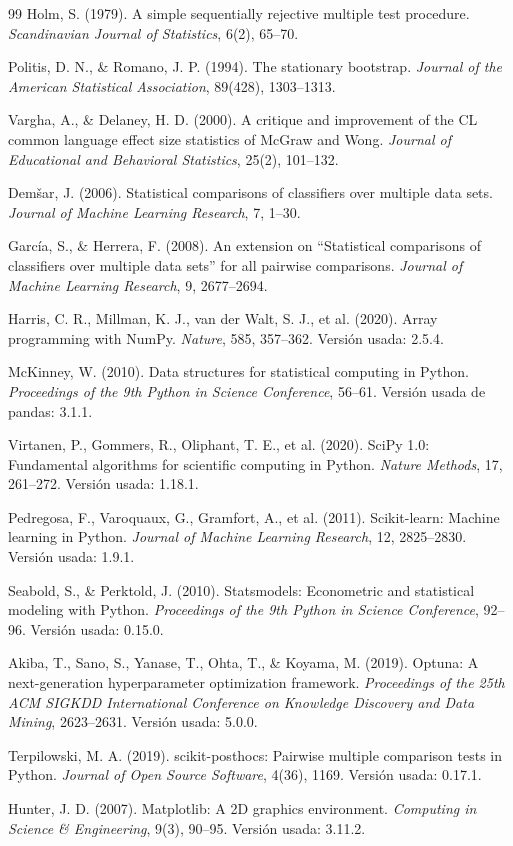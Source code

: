 \documentclass[11pt]{article}
\begin{document}
\begin{thebibliography}{99}
 Holm, S. (1979). A simple sequentially rejective multiple test procedure. \textit{Scandinavian Journal of Statistics}, 6(2), 65--70.

 Politis, D. N., \& Romano, J. P. (1994). The stationary bootstrap. \textit{Journal of the American Statistical Association}, 89(428), 1303--1313.

 Vargha, A., \& Delaney, H. D. (2000). A critique and improvement of the CL common language effect size statistics of McGraw and Wong. \textit{Journal of Educational and Behavioral Statistics}, 25(2), 101--132.

 Dem\v{s}ar, J. (2006). Statistical comparisons of classifiers over multiple data sets. \textit{Journal of Machine Learning Research}, 7, 1--30.

 García, S., \& Herrera, F. (2008). An extension on ``Statistical comparisons of classifiers over multiple data sets'' for all pairwise comparisons. \textit{Journal of Machine Learning Research}, 9, 2677--2694.

 Harris, C. R., Millman, K. J., van der Walt, S. J., et al. (2020). Array programming with NumPy. \textit{Nature}, 585, 357--362. Versión usada: 2.5.4.

 McKinney, W. (2010). Data structures for statistical computing in Python. \textit{Proceedings of the 9th Python in Science Conference}, 56--61. Versión usada de pandas: 3.1.1.

 Virtanen, P., Gommers, R., Oliphant, T. E., et al. (2020). SciPy 1.0: Fundamental algorithms for scientific computing in Python. \textit{Nature Methods}, 17, 261--272. Versión usada: 1.18.1.

 Pedregosa, F., Varoquaux, G., Gramfort, A., et al. (2011). Scikit-learn: Machine learning in Python. \textit{Journal of Machine Learning Research}, 12, 2825--2830. Versión usada: 1.9.1.

 Seabold, S., \& Perktold, J. (2010). Statsmodels: Econometric and statistical modeling with Python. \textit{Proceedings of the 9th Python in Science Conference}, 92--96. Versión usada: 0.15.0.

 Akiba, T., Sano, S., Yanase, T., Ohta, T., \& Koyama, M. (2019). Optuna: A next-generation hyperparameter optimization framework. \textit{Proceedings of the 25th ACM SIGKDD International Conference on Knowledge Discovery and Data Mining}, 2623--2631. Versión usada: 5.0.0.

 Terpilowski, M. A. (2019). scikit-posthocs: Pairwise multiple comparison tests in Python. \textit{Journal of Open Source Software}, 4(36), 1169. Versión usada: 0.17.1.

 Hunter, J. D. (2007). Matplotlib: A 2D graphics environment. \textit{Computing in Science \& Engineering}, 9(3), 90--95. Versión usada: 3.11.2.

\end{thebibliography}
\end{document}
